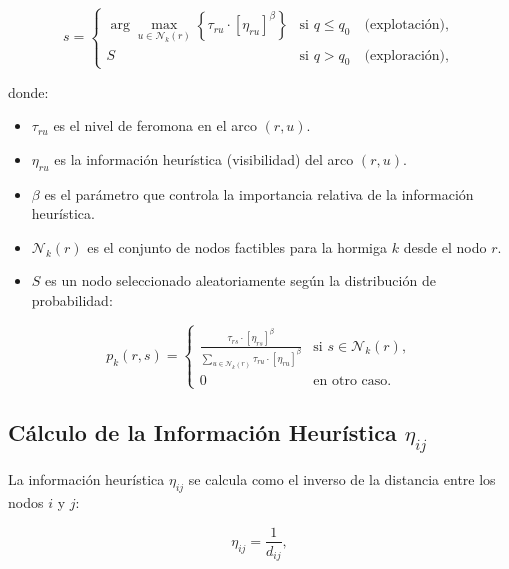 \documentclass[12pt, letterpaper]{article}
\begin{document}
\begin{equation}
  \label{eq:state_transition}
  s =
  \begin{cases}
    \displaystyle\arg\max_{u \in \mathcal{N}_k(r)}
      \left\{
        \tau_{ru} \cdot [\eta_{ru}]^{\beta}
      \right\}
    & \text{si } q \leq q_0 \quad \text{(explotación)}, \\[12pt]
    S & \text{si } q > q_0 \quad \text{(exploración)},
  \end{cases}
\end{equation}

\noindent donde:
\begin{itemize}[leftmargin=2cm]
  \item $\tau_{ru}$ es el nivel de feromona en el arco $(r, u)$.
  \item $\eta_{ru}$ es la información heurística (visibilidad) del arco $(r, u)$.
  \item $\beta$ es el parámetro que controla la importancia relativa de la información heurística.
  \item $\mathcal{N}_k(r)$ es el conjunto de nodos factibles para la hormiga $k$ desde el nodo $r$.
  \item $S$ es un nodo seleccionado aleatoriamente según la distribución de probabilidad:
\end{itemize}

\begin{equation}
  \label{eq:probabilidad_exploracion}
  p_k(r, s) =
  \begin{cases}
    \displaystyle\frac{\tau_{rs} \cdot [\eta_{rs}]^{\beta}}
    {\displaystyle\sum_{u \in \mathcal{N}_k(r)} \tau_{ru} \cdot [\eta_{ru}]^{\beta}}
    & \text{si } s \in \mathcal{N}_k(r), \\[12pt]
    0 & \text{en otro caso}.
  \end{cases}
\end{equation}

\subsection{Cálculo de la Información Heurística $\eta_{ij}$}
\label{subsec:eta}

La información heurística $\eta_{ij}$ se calcula como el inverso de la distancia entre los nodos $i$ y $j$:

\begin{equation}
  \label{eq:eta}
  \eta_{ij} = \frac{1}{d_{ij}},
\end{equation}
\end{document}
